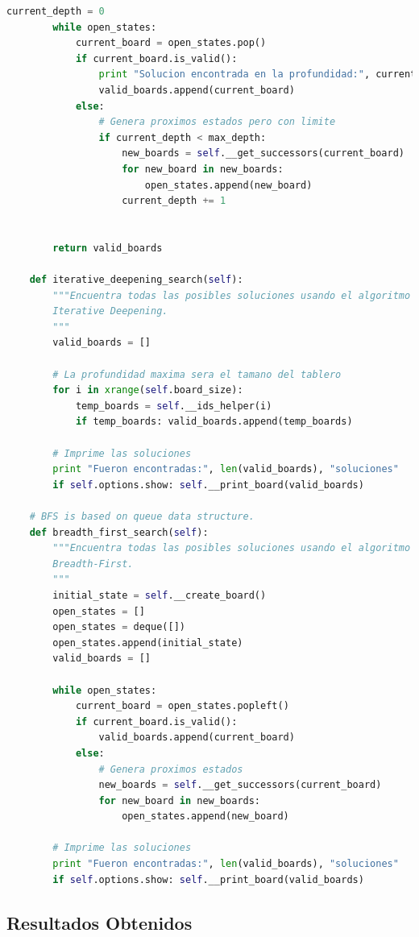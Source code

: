 \documentclass[letter, 10pt]{article}
\begin{document}
\begin{lstlisting}[language=python,frame=single]
        current_depth = 0
        while open_states:
            current_board = open_states.pop()
            if current_board.is_valid():
                print "Solucion encontrada en la profundidad:", current_depth
                valid_boards.append(current_board)
            else:
                # Genera proximos estados pero con limite
                if current_depth < max_depth:
                    new_boards = self.__get_successors(current_board)
                    for new_board in new_boards:
                        open_states.append(new_board)
                    current_depth += 1


        return valid_boards
    
    def iterative_deepening_search(self):
        """Encuentra todas las posibles soluciones usando el algoritmo 
        Iterative Deepening.
        """
        valid_boards = []

        # La profundidad maxima sera el tamano del tablero
        for i in xrange(self.board_size):
            temp_boards = self.__ids_helper(i)
            if temp_boards: valid_boards.append(temp_boards)

        # Imprime las soluciones
        print "Fueron encontradas:", len(valid_boards), "soluciones"
        if self.options.show: self.__print_board(valid_boards)

    # BFS is based on queue data structure.
    def breadth_first_search(self):
        """Encuentra todas las posibles soluciones usando el algoritmo 
        Breadth-First.
        """
        initial_state = self.__create_board()
        open_states = []
        open_states = deque([])
        open_states.append(initial_state)
        valid_boards = []

        while open_states:
            current_board = open_states.popleft()
            if current_board.is_valid():
                valid_boards.append(current_board)
            else:
                # Genera proximos estados
                new_boards = self.__get_successors(current_board)
                for new_board in new_boards:
                    open_states.append(new_board)

        # Imprime las soluciones
        print "Fueron encontradas:", len(valid_boards), "soluciones"
        if self.options.show: self.__print_board(valid_boards)
\end{lstlisting}

\subsection{Resultados Obtenidos}
\end{document}
